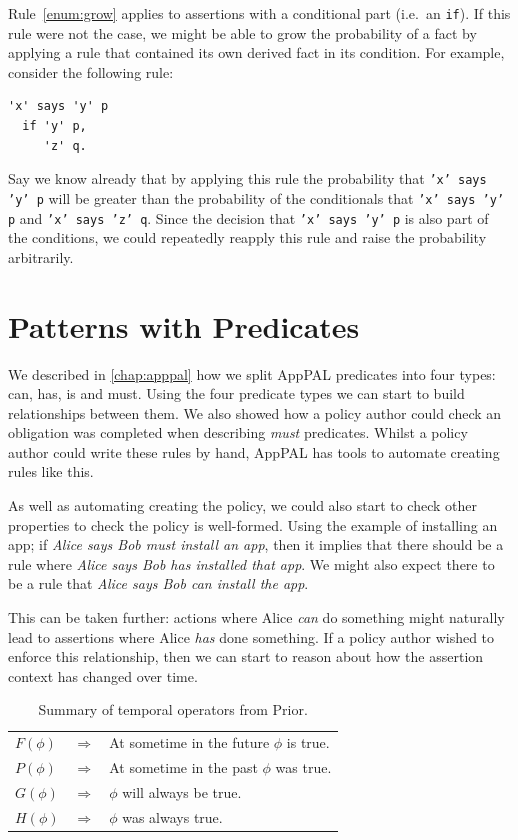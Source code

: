 \documentclass[thesis.tex]{subfiles}
\begin{document}
Rule~\ref{enum:grow} applies to assertions with a conditional part (i.e.~an
\texttt{if}). If this rule were not the case, we might be able to grow the
probability of a fact by applying a rule that contained its own derived fact in
its condition. For example, consider the following rule:
\begin{lstlisting}
'x' says 'y' p
  if 'y' p,
     'z' q.
\end{lstlisting} Say we know already that by applying this rule the probability
that \texttt{'x' says 'y' p} will be greater than the probability of the
conditionals that \texttt{'x' says 'y' p} and \texttt{'x' says 'z' q}. Since the
decision that \texttt{'x' says 'y' p} is also part of the conditions, we could
repeatedly reapply this rule and raise the probability arbitrarily.

\section{Patterns with Predicates}
\label{sec:patterns-with-predicates}

We described in \autoref{chap:apppal} how we split AppPAL predicates into four types: can, has, is and must.
Using the four predicate types we can start to build relationships between them.
We also showed how a policy author could check an obligation was completed when
describing \emph{must} predicates.  Whilst a policy author could write these
rules by hand, AppPAL has tools to automate creating rules like this.

As well as automating creating the policy, we could also start to check other
properties to check the policy is well-formed. Using the example of installing
an app; if \emph{Alice says Bob must install
  an app}, then it implies that there should be a rule where \emph{Alice says
Bob has installed that app}.  We might also expect there to be a rule that
\emph{Alice says Bob can install the app}.

This can be taken further: actions where Alice \emph{can} do something might
naturally lead to assertions where Alice \emph{has} done something.  If a policy
author wished to enforce this relationship, then we can start to reason about how the
assertion context has changed over time.

\begin{table}\centering\sffamily
 \begin{tabular}{l c l}
   \toprule
     $F(\phi)$ & $\Rightarrow$ & At sometime in the future $\phi$ is true. \\
     $P(\phi)$ & $\Rightarrow$ & At sometime in the past $\phi$ was true. \\
     $G(\phi)$ & $\Rightarrow$ & $\phi$ will always be true. \\
     $H(\phi)$ & $\Rightarrow$ & $\phi$ was always true. \\
   \bottomrule
 \end{tabular}
 \caption{Summary of temporal operators from Prior.}
 \label{tab:temporal-operators}
\end{table}
\end{document}

